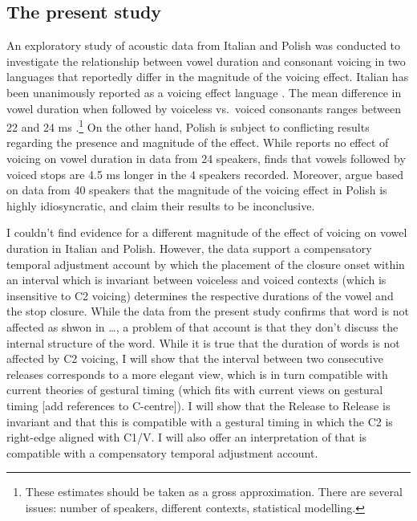\documentclass[preprint]{JASAnew}
\begin{document}
\hypertarget{the-present-study}{%
\subsection{The present study}\label{the-present-study}}

An exploratory study of acoustic data from Italian and Polish was
conducted to investigate the relationship between vowel duration and
consonant voicing in two languages that reportedly differ in the
magnitude of the voicing effect. Italian has been unanimously reported
as a voicing effect language
\citep{caldognetto1979, farnetani1986, esposito2002}. The mean
difference in vowel duration when followed by voiceless vs.~voiced
consonants ranges between 22 and 24 ms \citep[with longer vowels
followed by voiced
consonants,][]{farnetani1986, esposito2002}.\footnote{These estimates should be taken as a gross approximation.
There are several issues: number of speakers, different contexts, statistical modelling.}
On the other hand, Polish is subject to conflicting results regarding
the presence and magnitude of the effect. While \citet{keating1984}
reports no effect of voicing on vowel duration in data from 24 speakers,
\citet{nowak2006} finds that vowels followed by voiced stops are 4.5 ms
longer in the 4 speakers recorded. Moreover, \citet{malisz2008} argue
based on data from 40 speakers that the magnitude of the voicing effect
in Polish is highly idiosyncratic, and claim their results to be
inconclusive.

I couldn't find evidence for a different magnitude of the effect of
voicing on vowel duration in Italian and Polish. However, the data
support a compensatory temporal adjustment account by which the
placement of the closure onset within an interval which is invariant
between voiceless and voiced contexts (which is insensitive to C2
voicing) determines the respective durations of the vowel and the stop
closure. While the data from the present study confirms that word is not
affected as shwon in \ldots{}, a problem of that account is that they
don't discuss the internal structure of the word. While it is true that
the duration of words is not affected by C2 voicing, I will show that
the interval between two consecutive releases corresponds to a more
elegant view, which is in turn compatible with current theories of
gestural timing (which fits with current views on gestural timing {[}add
references to C-centre{]}). I will show that the Release to Release is
invariant and that this is compatible with a gestural timing in which
the C2 is right-edge aligned with C1/V. I will also offer an
interpretation of \citet{maddieson1976} that is compatible with a
compensatory temporal adjustment account.
\end{document}
